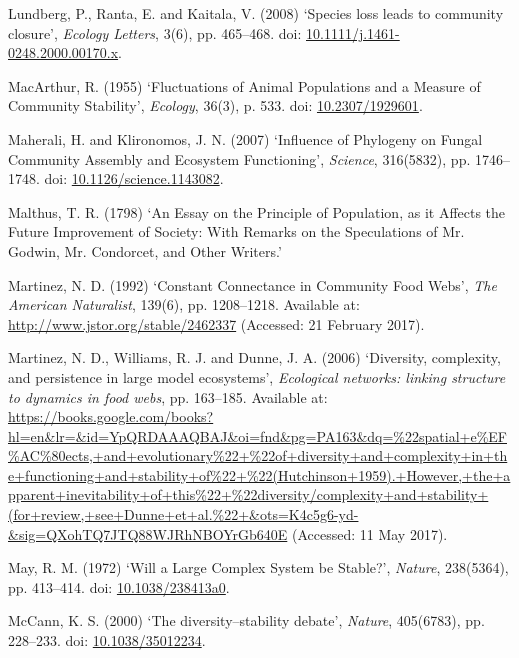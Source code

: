 \documentclass[12pt]{article}
\begin{document}
\hypertarget{ref-lund08sll}{}
Lundberg, P., Ranta, E. and Kaitala, V. (2008) `Species loss leads to
community closure', \emph{Ecology Letters}, 3(6), pp. 465--468. doi:
\href{https://doi.org/10.1111/j.1461-0248.2000.00170.x}{10.1111/j.1461-0248.2000.00170.x}.

\hypertarget{ref-maca55fap}{}
MacArthur, R. (1955) `Fluctuations of Animal Populations and a Measure
of Community Stability', \emph{Ecology}, 36(3), p. 533. doi:
\href{https://doi.org/10.2307/1929601}{10.2307/1929601}.

\hypertarget{ref-mahe07ipf}{}
Maherali, H. and Klironomos, J. N. (2007) `Influence of Phylogeny on
Fungal Community Assembly and Ecosystem Functioning', \emph{Science},
316(5832), pp. 1746--1748. doi:
\href{https://doi.org/10.1126/science.1143082}{10.1126/science.1143082}.

\hypertarget{ref-malt98epp}{}
Malthus, T. R. (1798) `An Essay on the Principle of Population, as it
Affects the Future Improvement of Society: With Remarks on the
Speculations of Mr. Godwin, Mr. Condorcet, and Other Writers.'

\hypertarget{ref-mart92ccc}{}
Martinez, N. D. (1992) `Constant Connectance in Community Food Webs',
\emph{The American Naturalist}, 139(6), pp. 1208--1218. Available at:
\url{http://www.jstor.org/stable/2462337} (Accessed: 21 February 2017).

\hypertarget{ref-mart06dcp}{}
Martinez, N. D., Williams, R. J. and Dunne, J. A. (2006) `Diversity,
complexity, and persistence in large model ecosystems', \emph{Ecological
networks: linking structure to dynamics in food webs}, pp. 163--185.
Available at:
\url{https://books.google.com/books?hl=en\&lr=\&id=YpQRDAAAQBAJ\&oi=fnd\&pg=PA163\&dq=\%22spatial+e\%EF\%AC\%80ects,+and+evolutionary\%22+\%22of+diversity+and+complexity+in+the+functioning+and+stability+of\%22+\%22(Hutchinson+1959).+However,+the+apparent+inevitability+of+this\%22+\%22diversity/complexity+and+stability+(for+review,+see+Dunne+et+al.\%22+\&ots=K4c5g6-yd-\&sig=QXohTQ7JTQ88WJRhNBOYrGb640E}
(Accessed: 11 May 2017).

\hypertarget{ref-may72wlc}{}
May, R. M. (1972) `Will a Large Complex System be Stable?',
\emph{Nature}, 238(5364), pp. 413--414. doi:
\href{https://doi.org/10.1038/238413a0}{10.1038/238413a0}.

\hypertarget{ref-mcca00dd}{}
McCann, K. S. (2000) `The diversity--stability debate', \emph{Nature},
405(6783), pp. 228--233. doi:
\href{https://doi.org/10.1038/35012234}{10.1038/35012234}.
\end{document}
